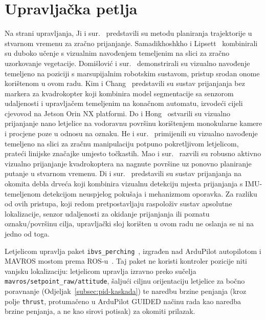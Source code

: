 \section{Upravljačka petlja}
\label{sec:upravljacka-petlja}

Na strani upravljanja, Ji i sur.~\cite{ji2022realtimetrajectoryplanningaerial} predstavili su metodu planiranja trajektorije u stvarnom vremenu za zračno prijanjanje. Samadikhoshkho i Lipsett~\cite{drones8110605} kombinirali su duboko učenje s vizualnim navođenjem temeljenim na slici za zračno uzorkovanje vegetacije. Domišlović i sur.~\cite{domislovic_marsupial} demonstrirali su vizualno navođenje temeljeno na poziciji s marsupijalnim robotskim sustavom, pristup srodan onome korištenom u ovom radu. Kim i Chang~\cite{drones10040270} predstavili su sustav prijanjanja bez markera za kvadrokopter koji kombinira model segmentacije sa senzorom udaljenosti i upravljačem temeljenim na konačnom automatu, izvodeći cijeli cjevovod na Jetson Orin NX platformi. Do i Hong~\cite{do2023visionbased} ostvarili su vizualno prijanjanje nano letjelice na vodoravnu površinu korištenjem monokularne kamere i procjene poze u odnosu na oznaku. He i sur.~\cite{he2023imagebased} primijenili su vizualno navođenje temeljeno na slici za zračnu manipulaciju potpuno pokretljivom letjelicom, prateći linijske značajke umjesto točkastih. Mao i sur.~\cite{mao2023robust} razvili su robusno aktivno vizualno prijanjanje kvadrokoptera na nagnute površine uz ponovno planiranje putanje u stvarnom vremenu. Di i sur.~\cite{di2026slap} predstavili su sustav prijanjanja na okomita debla drveća koji kombinira vizualnu detekciju mjesta prijanjanja s IMU-temeljenom detekcijom neuspjelog pokušaja i mehanizmom oporavka. Za razliku od ovih pristupa, koji redom pretpostavljaju raspoloživ sustav apsolutne lokalizacije, senzor udaljenosti za okidanje prijanjanja ili poznatu oznaku/površinu cilja, upravljački sloj korišten u ovom radu ne oslanja se ni na jedno od toga.

Letjelicom upravlja paket \texttt{ibvs\_perching}~\cite{ibvs_perching}, izgrađen nad ArduPilot autopilotom i MAVROS mostom prema ROS-u~\cite{aliane2024survey}. Taj paket ne koristi kontroler pozicije niti vanjsku lokalizaciju: letjelicom upravlja izravno preko sučelja \texttt{mavros/setpoint\_raw/attitude}, šaljući ciljnu orijentaciju letjelice za bočno poravnanje (Odjeljak~\ref{subsec:pid-kaskada}) te naredbu brzine penjanja (kroz polje \texttt{thrust}, protumačeno u ArduPilot GUIDED načinu rada kao naredba brzine penjanja, a ne kao sirovi potisak) za okomiti prilazak.


